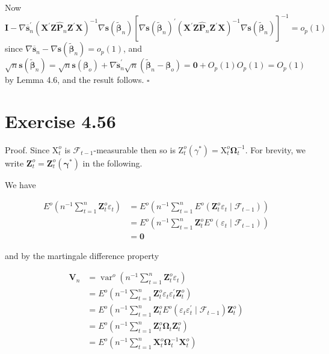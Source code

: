 \documentclass[10pt]{article}
\begin{document}
Now\\
$\mathbf{I}-\nabla \overline{\mathbf{s}}_{n}^{\prime}\left(\mathbf{X}^{\prime} \mathbf{Z} \hat{\mathbf{P}}_{n} \mathbf{Z}^{\prime} \mathbf{X}\right)^{-1} \nabla \mathbf{s}\left(\tilde{\boldsymbol{\beta}}_{n}\right)\left[\nabla \mathbf{s}\left(\tilde{\boldsymbol{\beta}}_{n}\right)^{\prime}\left(\mathbf{X}^{\prime} \mathbf{Z} \hat{\mathbf{P}}_{n} \mathbf{Z}^{\prime} \mathbf{X}\right)^{-1} \nabla \mathbf{s}\left(\tilde{\boldsymbol{\beta}}_{n}\right)\right]^{-1}=o_{p}(1)$ since $\nabla \overline{\mathbf{s}}_{n}-\nabla \mathbf{s}\left(\tilde{\boldsymbol{\beta}}_{n}\right)=o_{p}(1)$, and $\sqrt{n} \mathbf{s}\left(\tilde{\boldsymbol{\beta}}_{n}\right)=\sqrt{n} \mathbf{s}\left(\boldsymbol{\beta}_{o}\right)+\nabla \ddot{\mathbf{s}}_{n}^{\prime} \sqrt{n}\left(\tilde{\boldsymbol{\beta}}_{n}-\right. \left.\boldsymbol{\beta}_{o}\right)=\mathbf{0}+O_{p}(1) O_{p}(1)=O_{p}(1)$ by Lemma 4.6, and the result follows. \(\square\)

\section*{Exercise 4.56}
Proof. Since $\mathrm{X}_{t}^{o}$ is $\mathcal{F}_{t-1}$-measurable then so is $\mathrm{Z}_{t}^{o}\left(\gamma^{*}\right)=\mathrm{X}_{t}^{o} \boldsymbol{\Omega}_{t}^{-1}$. For brevity, we write $\mathbf{Z}_{t}^{o}=\mathbf{Z}_{t}^{o}\left(\boldsymbol{\gamma}^{*}\right)$ in the following.

We have

$$
\begin{aligned}
E^{o}\left(n^{-1} \sum_{t=1}^{n} \mathbf{Z}_{t}^{o} \varepsilon_{t}\right) & =E^{o}\left(n^{-1} \sum_{t=1}^{n} E^{o}\left(\mathbf{Z}_{t}^{o} \varepsilon_{t} \mid \mathcal{F}_{t-1}\right)\right) \\
& =E^{o}\left(n^{-1} \sum_{t=1}^{n} \mathbf{Z}_{t}^{o} E^{o}\left(\varepsilon_{t} \mid \mathcal{F}_{t-1}\right)\right) \\
& =\mathbf{0}
\end{aligned}
$$

and by the martingale difference property

$$
\begin{aligned}
\mathbf{V}_{n} & =\operatorname{var}^{o}\left(n^{-1} \sum_{t=1}^{n} \mathbf{Z}_{t}^{o} \varepsilon_{t}\right) \\
& =E^{o}\left(n^{-1} \sum_{t=1}^{n} \mathbf{Z}_{t}^{o} \varepsilon_{t} \varepsilon_{t}^{\prime} \mathbf{Z}_{t}^{o}\right) \\
& =E^{o}\left(n^{-1} \sum_{t=1}^{n} \mathbf{Z}_{t}^{o} E^{o}\left(\varepsilon_{t} \varepsilon_{t}^{\prime} \mid \mathcal{F}_{t-1}\right) \mathbf{Z}_{t}^{o}\right) \\
& =E^{o}\left(n^{-1} \sum_{t=1}^{n} \mathbf{Z}_{t}^{o} \boldsymbol{\Omega}_{t} \mathbf{Z}_{t}^{o}\right) \\
& =E^{o}\left(n^{-1} \sum_{t=1}^{n} \mathbf{X}_{t}^{o} \boldsymbol{\Omega}_{t}^{-1} \mathbf{X}_{t}^{o}\right)
\end{aligned}
$$
\end{document}
